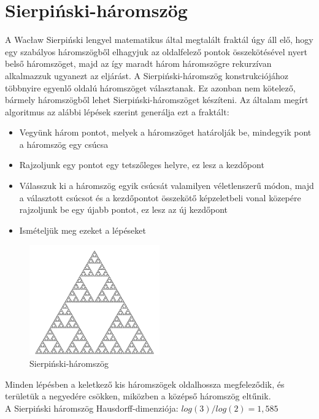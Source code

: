\section*{Sierpiński-háromszög}
A Wacław Sierpiński lengyel matematikus által megtalált fraktál úgy áll elő, hogy egy szabályos háromszögből elhagyjuk az oldalfelező pontok összekötésével nyert belső háromszöget, majd az így maradt három háromszögre rekurzívan alkalmazzuk ugyanezt az eljárást.
A Sierpiński-háromszög konstrukciójához többnyire egyenlő oldalú háromszöget választanak. Ez azonban nem kötelező, bármely háromszögből lehet Sierpiński-háromszöget készíteni.
Az általam megírt algoritmus az alábbi lépések szerint generálja ezt a fraktált:
\begin{itemize}
\item Vegyünk három pontot, melyek a háromszöget határolják be, mindegyik pont a háromszög egy csúcsa
\item Rajzoljunk egy pontot egy tetszőleges helyre, ez lesz a kezdőpont
\item Válasszuk ki a háromszög egyik csúcsát valamilyen véletlenszerű módon, majd a választott csúcsot és a kezdőpontot összekötő képzeletbeli vonal közepére rajzoljunk be egy újabb pontot, ez lesz az új kezdőpont
\item Ismételjük meg ezeket a lépéseket
\end{itemize}
\begin{figure}[!ht]
\begin{center}
	\includegraphics[width=0.5\textwidth]{img/SierpinskiTriangle}
	\caption[labelInTOC]{Sierpiński-háromszög}
\end{center}
\end{figure}
Minden lépésben a keletkező kis háromszögek oldalhossza megfeleződik, és területük a negyedére csökken, miközben a középső háromszög eltűnik.\\
A Sierpiński háromszög Hausdorff-dimenziója: $log(3)/log(2) = 1,585$
